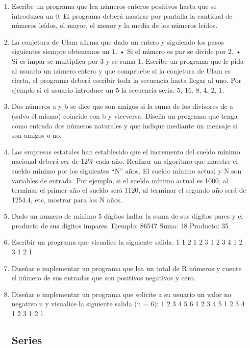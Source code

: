 \documentclass{scrartcl}
\begin{document}
\begin{enumerate}
		\item Escribe un programa que lea números enteros positivos hasta que se introduzca un 0. El programa deberá mostrar por pantalla la cantidad de números leídos, el mayor, el menor y la media de los números leídos.
		
		\item La conjetura de Ulam afirma que dado un entero y siguiendo los pasos siguientes siempre obtenemos un 1. • Si el número es par se divide por 2. • Si es impar se	multiplica por 3 y se suma 1. Escribe un programa que le pida al usuario un número	entero y que compruebe si la conjetura de Ulam es cierta, el programa deberá	escribir toda la secuencia hasta llegar al uno. Por ejemplo si el usuario introduce un	5 la secuencia sería: 5, 16, 8, 4, 2, 1.
		
		\item Dos números a y b se dice que son amigos si la suma de los divisores de a (salvo él mismo) coincide con b y viceversa. Diseña un programa que tenga como entrada dos números naturales y que indique mediante un mensaje si son amigos o no.
		
		\item Las empresas estatales han establecido que el incremento del sueldo mínimo nacional deberá ser de 12\% cada año. Realizar un algoritmo que muestre el sueldo mínimo por los siguientes “N” años. El sueldo mínimo actual y N son variables de entrada.	Por ejemplo, si el sueldo mínimo actual es 1000, al terminar el primer año el sueldo será 1120, al terminar el segundo año será de 1254.4, etc, mostrar para los N años.
		
		\item Dado un numero de mínimo 5 dígitos hallar la suma de sus dígitos pares y el
		producto de sus dígitos impares.
		Ejemplo: 86547
		Suma: 18
		Producto: 35
		\item Escribir un programa que visualice la siguiente salida:
		1
		1 2
		1 2 3
		1 2 3 4
		1 2 3
		1 2
		1
		
		\item Diseñar e implementar un programa que lea un total de R números y cuente el
		número de sus entradas que son positivos negativos y cero.
		
		\item Diseñar e implementar un programa que solicite a su usuario un valor no negativo
		n y visualice la siguiente salida (n = 6):
		1 2 3 4 5 6
		1 2 3 4 5
		1 2 3 4
		1 2 3
		1 2
		1
		
		\subsection{Series}
		

\end{enumerate}
\end{document}
